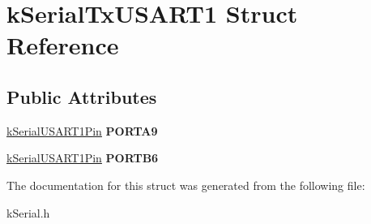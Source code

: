\hypertarget{structkSerialTxUSART1}{}\section{k\+Serial\+Tx\+U\+S\+A\+R\+T1 Struct Reference}
\label{structkSerialTxUSART1}
\subsection*{Public Attributes}
\begin{DoxyCompactItemize}
\item 
\hyperlink{structkSerialUSART1Pin}{k\+Serial\+U\+S\+A\+R\+T1\+Pin} {\bfseries P\+O\+R\+T\+A9}\hypertarget{structkSerialTxUSART1_a5939be4c8d1028a52394c5075b884f68}{}\label{structkSerialTxUSART1_a5939be4c8d1028a52394c5075b884f68}

\item 
\hyperlink{structkSerialUSART1Pin}{k\+Serial\+U\+S\+A\+R\+T1\+Pin} {\bfseries P\+O\+R\+T\+B6}\hypertarget{structkSerialTxUSART1_a5474b0934411f1db5b6711063bb10c23}{}\label{structkSerialTxUSART1_a5474b0934411f1db5b6711063bb10c23}

\end{DoxyCompactItemize}


The documentation for this struct was generated from the following file\+:\begin{DoxyCompactItemize}
\item 
k\+Serial.\+h\end{DoxyCompactItemize}
